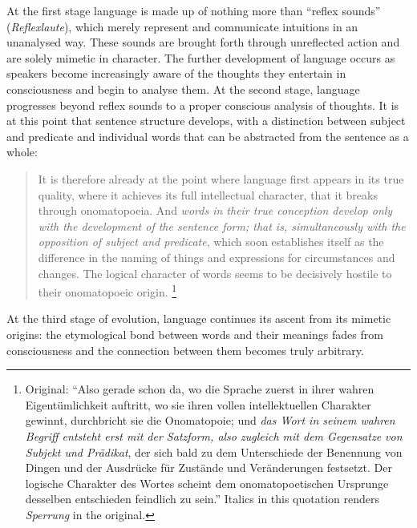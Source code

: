 \documentclass[output=paper]{langscibook}
\begin{document}
At the first stage language is made up of nothing more than ``reflex sounds'' (\emph{Reflexlaute}), which merely represent and communicate intuitions in an unanalysed way. These sounds are brought forth through unreflected action and are solely mimetic in character. The further development of language occurs as speakers become increasingly aware of the thoughts they entertain in consciousness and begin to analyse them. At the second stage, language progresses beyond reflex sounds to a proper conscious analysis of thoughts. It is at this point that sentence structure develops, with a distinction between subject and predicate and individual words that can be abstracted from the sentence as a whole:

\begin{quotation}
It is therefore already at the point where language first appears in its true quality, where it achieves its full intellectual character, that it breaks through onomatopoeia. And \emph{words in their true conception develop only with the development of the sentence form; that is, simultaneously with the opposition of subject and predicate}, which soon establishes itself as the difference in the naming of things and expressions for circumstances and changes. The logical character of words seems to be decisively hostile to their onomatopoeic origin. \citep[424--425]{Steinthal1881}\footnote{Original: ``Also gerade schon da, wo die Sprache zuerst in ihrer wahren Eigentümlichkeit auftritt, wo sie ihren vollen intellektuellen Charakter gewinnt, durchbricht sie die Onomatopoie; und \emph{das Wort in seinem wahren Begriff entsteht erst mit der Satzform, also zugleich mit dem Gegensatze von Subjekt und Prädikat}, der sich bald zu dem Unterschiede der Benennung von Dingen und der Ausdrücke für Zustände und Veränderungen festsetzt. Der logische Charakter des Wortes scheint dem onomatopoetischen Ursprunge desselben entschieden feindlich zu sein.'' Italics in this quotation renders \emph{Sperrung} in the original.}
\end{quotation}

At the third stage of evolution, language continues its ascent from its mimetic origins: the etymological bond between words and their meanings fades from consciousness and the connection between them becomes truly arbitrary.
\end{document}
